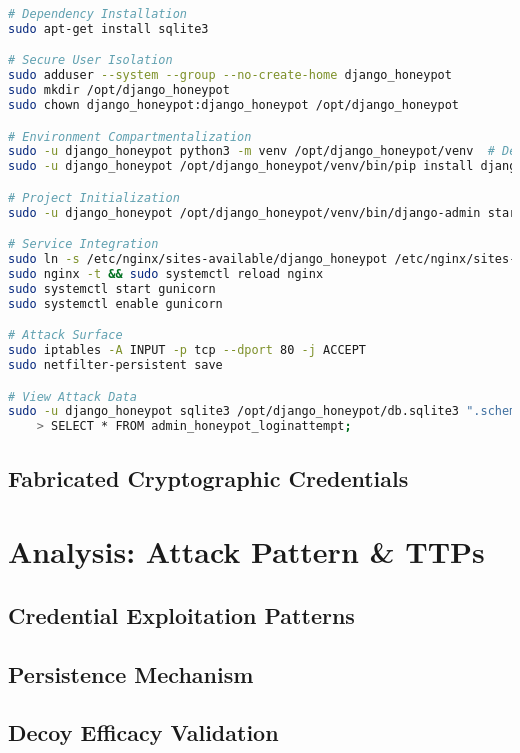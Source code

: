 \documentclass{cls/ULBreport}
\begin{document}
\begin{lstlisting}[language=bash,label={lst:cowrie-context},caption={Ubuntu Setup of a Django Honeypot Webservice}]  
# Dependency Installation
sudo apt-get install sqlite3

# Secure User Isolation
sudo adduser --system --group --no-create-home django_honeypot
sudo mkdir /opt/django_honeypot
sudo chown django_honeypot:django_honeypot /opt/django_honeypot

# Environment Compartmentalization
sudo -u django_honeypot python3 -m venv /opt/django_honeypot/venv  # Dependency isolation
sudo -u django_honeypot /opt/django_honeypot/venv/bin/pip install django django-admin-honeypot gunicorn

# Project Initialization
sudo -u django_honeypot /opt/django_honeypot/venv/bin/django-admin startproject honeypot_project /opt/django_honeypot

# Service Integration
sudo ln -s /etc/nginx/sites-available/django_honeypot /etc/nginx/sites-enabled/ # Exposure
sudo nginx -t && sudo systemctl reload nginx
sudo systemctl start gunicorn
sudo systemctl enable gunicorn

# Attack Surface
sudo iptables -A INPUT -p tcp --dport 80 -j ACCEPT
sudo netfilter-persistent save

# View Attack Data
sudo -u django_honeypot sqlite3 /opt/django_honeypot/db.sqlite3 ".schema admin_honeypot_loginattempt"  # Verify capture schema
    > SELECT * FROM admin_honeypot_loginattempt;
\end{lstlisting}  


    \subsection{Fabricated Cryptographic Credentials}


\section{Analysis: Attack Pattern \& TTPs}

\subsection{Credential Exploitation Patterns}
\subsection{Persistence Mechanism}
\subsection{Decoy Efficacy Validation}
\end{document}
